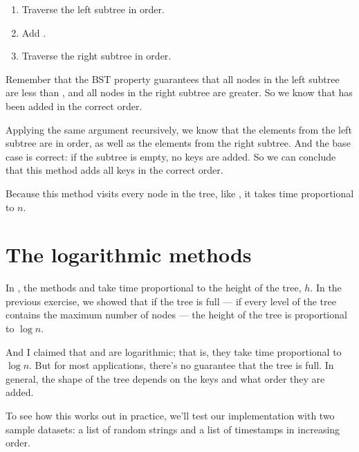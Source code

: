 \documentclass[12pt]{book}
\theoremstyle{exercise}
\begin{document}
\begin{enumerate}

\item
  Traverse the left subtree in order.

\item
  Add .

\item
  Traverse the right subtree in order.

\end{enumerate}

Remember that the BST property guarantees that all nodes in the left
subtree are less than , and all nodes in the right
subtree are greater. So we know that  has been added in
the correct order.


Applying the same argument recursively, we know that the elements from
the left subtree are in order, as well as the elements from the right
subtree.  And the base case is correct: if the subtree is empty, no
keys are added.  So we can conclude that this method adds all keys in
the correct order.

Because this method visits every node in the tree, like
, it takes time proportional to $n$.


\section{The logarithmic methods}
\label{the-logarithmic-methods}

In , the methods  and  take
time proportional to the height of the tree, $h$. In the previous
exercise, we showed that if the tree is full --- if every level of the tree
contains the maximum number of nodes --- the height of the tree is
proportional to $\log n$.


And I claimed that  and  are logarithmic; that
is, they take time proportional to $\log n$. But for most
applications, there's no guarantee that the tree is full. In general,
the shape of the tree depends on the keys and what order they are added.

To see how this works out in practice, we'll test our implementation
with two sample datasets: a list of random strings and a list of
timestamps in increasing order.
\end{document}
